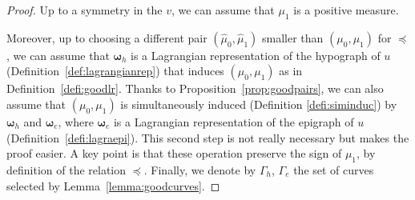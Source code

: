 \documentclass[11pt, twoside, reqno]{amsart}
\theoremstyle{definition}
\theoremstyle{remark}
\numberwithin{equation}{section}
\newcommand{\bs}[1]{\boldsymbol{#1}}
\begin{document}
 
\begin{proof}
Up to a symmetry in the $v$, we can assume that $\mu_1$ is a positive measure.

  Moreover, up to choosing a different pair $(\hat \mu_0, \hat \mu_1)$ smaller than $(\mu_0, \mu_1)$ for $\preceq$, we can assume that $\bs \omega_h$ is a Lagrangian representation of the hypograph of $u$ (Definition~\ref{def:lagrangianrep}) that induces $(\mu_0, \mu_1)$ as in Definition~\ref{defi:goodlr}. Thanks to Proposition~\ref{prop:goodpairs}, we can also assume that $(\mu_0, \mu_1)$ is simultaneously induced (Definition \ref{defi:siminduc}) by $\bs \omega_h$ and $\bs \omega_e$, where $\bs \omega_e$ is a Lagrangian representation of the epigraph of $u$ (Definition~\ref{defi:lagraepi}). This second step is not really necessary but makes the proof easier. A key point is that these operation preserve the sign of $\mu_1$, by definition of the relation $\preceq$. Finally, we denote by $\Gamma_h$, $\Gamma_e$ the set of curves selected by Lemma~\ref{lemma:goodcurves}.
  

\end{proof}
\end{document}

